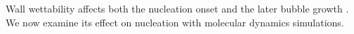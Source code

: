 Wall wettability affects both the nucleation onset and the later bubble growth \cite{kim2015,chen2019}. We now examine its effect on nucleation with molecular dynamics simulations.